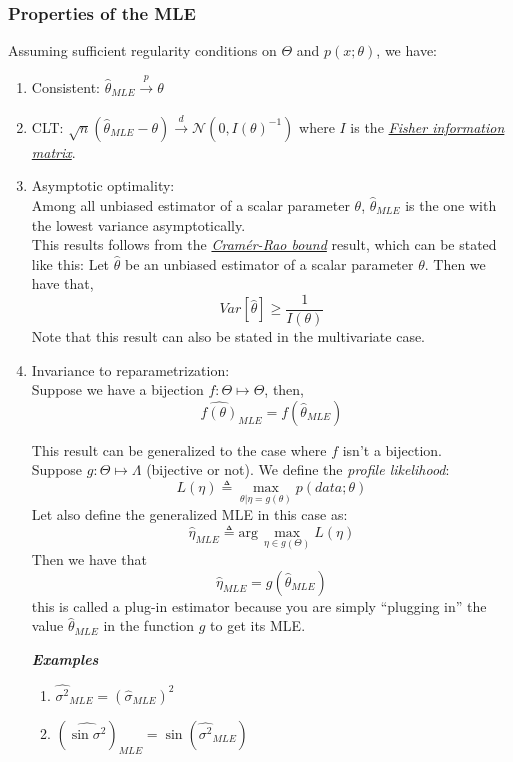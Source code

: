 \documentclass[12pt]{report}
\renewcommand{\emph}[1]{\color{violet}#1\color{black}{}}
\begin{document}
\subsubsection{Properties of the MLE}
Assuming sufficient regularity conditions on $\Theta$ and $p(x; \theta)$, we have:
\begin{enumerate}
\item Consistent: $\hat{\theta}_{MLE} \xrightarrow[]{p} \theta$
\item CLT: $\sqrt{n}(\hat{\theta}_{MLE}-\theta) \xrightarrow[]{d} \mathcal{N}(0,I(\theta)^{-1}) $ where $I$ is the 
\href{https://en.wikipedia.org/wiki/Fisher\_information\#Matrix\_form}{\textit{Fisher information matrix}}.
\item Asymptotic optimality:\\
Among all unbiased estimator of a scalar parameter $\theta$, $\hat{\theta}_{MLE}$ is the one with the lowest variance asymptotically. \\This results follows from the \href{https://en.wikipedia.org/wiki/Cram\%C3\%A9r-Rao\_bound}{\textit{Cramér-Rao bound}} result, which can be stated like this: Let $\hat{\theta}$ be an unbiased estimator of a scalar parameter $\theta$. Then we have that,
$$Var[\hat{\theta}]\geq \frac{1}{I(\theta)}$$
Note that this result can also be stated in the multivariate case.
\item Invariance to reparametrization:\\
Suppose we have a bijection $f:\Theta \mapsto \Theta$, then,
$$\widehat{f(\theta)}_{MLE} = f(\hat{\theta}_{MLE})$$

This result can be generalized to the case where $f$ isn't a bijection.\\
Suppose $g: \Theta \mapsto \Lambda$ (bijective or not). We define the \textit{profile likelihood}:
$$L(\eta) \triangleq \max\limits_{\theta | \eta = g(\theta)}p(data;\theta)$$
Let also define the generalized MLE in this case as:
$$\hat{\eta}_{MLE} \triangleq \text{arg}\,\max\limits_{\eta \in g(\Theta)}L(\eta)$$
Then we have that
$$\hat{\eta}_{MLE} = g(\hat{\theta}_{MLE})$$
this is called a \emph{plug-in estimator} because you are simply ``plugging in'' the value $\hat{\theta}_{MLE}$ in the function $g$ to get its MLE.

\textbf{\textit{Examples}}
\begin{enumerate}
\item $\widehat{\sigma^2}_{MLE} = (\hat{\sigma}_{MLE})^2$
\item $(\widehat{\sin\sigma^2})_{MLE} = \sin(\hat{\sigma^2}_{MLE})$
\end{enumerate}

\end{enumerate}
\end{document}
